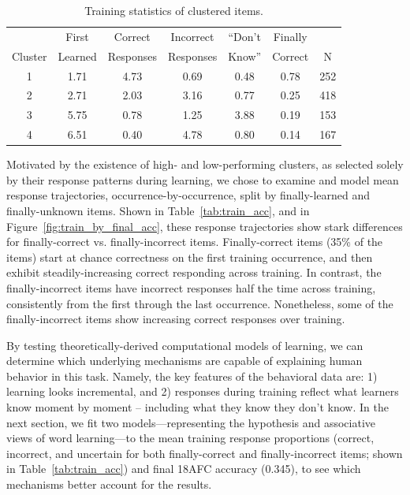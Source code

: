 \documentclass[man,floatsintext]{apa6}
\begin{document}
\begin{table}[ht] 
\begin{center}
\caption{Training statistics of clustered items.} 
\label{tab:clusters} 
\vskip 0.05in
\begin{tabular}{c c c c c c c}
\hline
                & First  & Correct               & Incorrect  & ``Don't  & Finally  &  \\
 Cluster  & Learned &  Responses &  Responses & Know'' &  Correct & N \\
\hline
       1  &   1.71    &    4.73 &  0.69     &       0.48    &      0.78  & 252 \\
       2  &    2.71   &    2.03 &  3.16     &       0.77    &      0.25  & 418 \\
       3  &   5.75    &    0.78 &  1.25     &       3.88    &      0.19  & 153 \\
       4  &   6.51    &    0.40 &  4.78     &       0.80    &      0.14  & 167 \\
\hline
\end{tabular} 
\end{center}
\end{table}



Motivated by the existence of high- and low-performing clusters, as selected solely by their response patterns during learning, we chose to examine and model mean response trajectories, occurrence-by-occurrence, split by finally-learned and finally-unknown items. Shown in Table~\ref{tab:train_acc}, and in Figure~\ref{fig:train_by_final_acc}, these response trajectories show stark differences for finally-correct vs. finally-incorrect items. Finally-correct items (35\% of the items) start at chance correctness on the first training occurrence, and then exhibit steadily-increasing correct responding across training. In contrast, the finally-incorrect items have incorrect responses half the time across training, consistently from the first through the last occurrence. Nonetheless, some of the finally-incorrect items show increasing correct responses over training.

By testing theoretically-derived computational models of learning, we can determine which underlying mechanisms are capable of explaining human behavior in this task. Namely, the key features of the behavioral data are: 1) learning looks incremental, and 2) responses during training reflect what learners know moment by moment -- including what they know they don't know. In the next section, we fit two models---representing the hypothesis and associative views of word learning---to the mean training response proportions (correct, incorrect, and uncertain for both finally-correct and finally-incorrect items; shown in Table~\ref{tab:train_acc}) and final 18AFC accuracy (0.345), to see which mechanisms better account for the results.
\end{document}
